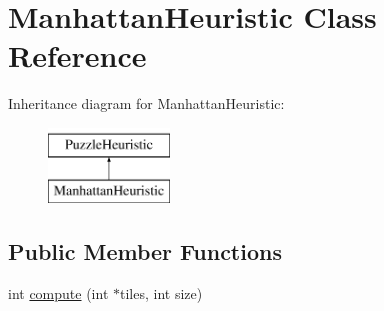 \hypertarget{classManhattanHeuristic}{\section{\-Manhattan\-Heuristic \-Class \-Reference}
\label{classManhattanHeuristic}
}
\-Inheritance diagram for \-Manhattan\-Heuristic\-:\begin{figure}[H]
\begin{center}
\leavevmode
\includegraphics[height=2.000000cm]{classManhattanHeuristic}
\end{center}
\end{figure}
\subsection*{\-Public \-Member \-Functions}
\begin{DoxyCompactItemize}
\item 
int \hyperlink{classManhattanHeuristic_a061af5e85bffa6a6f7cebbce17f5e7e5}{compute} (int $\ast$tiles, int size)
\end{DoxyCompactItemize}


